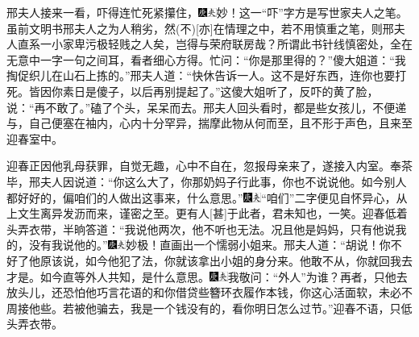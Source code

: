 邢夫人接来一看，吓得连忙死紧攥住，{\includegraphics[width=3mm]{../Images/00004}\includegraphics[width=3mm]{../Images/00012}\footnotesize \kaishu 妙！这一“吓”字方是写世家夫人之笔。虽前文明书邢夫人之为人稍劣，然{(不)}{[}亦{]}在情理之中，若不用慎重之笔，则邢夫人直系一小家卑污极轻贱之人矣，岂得与荣府联房哉？所谓此书针线慎密处，全在无意中一字一句之间耳，看者细心方得。}忙问：“你是那里得的？”傻大姐道：“我掏促织儿在山石上拣的。”邢夫人道：“快休告诉一人。这不是好东西，连你也要打死。皆因你素日是傻子，以后再别提起了。”这傻大姐听了，反吓的黄了脸，说：“再不敢了。”磕了个头，呆呆而去。邢夫人回头看时，都是些女孩儿，不便递与，自己便塞在袖内，心内十分罕异，揣摩此物从何而至，且不形于声色，且来至迎春室中。

迎春正因他乳母获罪，自觉无趣，心中不自在，忽报母亲来了，遂接入内室。奉茶毕，邢夫人因说道：“你这么大了，你那奶妈子行此事，你也不说说他。如今别人都好好的，偏咱们的人做出这事来，什么意思。”{\includegraphics[width=3mm]{../Images/00004}\includegraphics[width=3mm]{../Images/00012}\footnotesize \kaishu “咱们”二字便见自怀异心，从上文生离异发沥而来，谨密之至。更有人{[}甚{]}于此者，君未知也，一笑。}迎春低着头弄衣带，半晌答道：“我说他两次，他不听也无法。况且他是妈妈，只有他说我的，没有我说他的。”{\includegraphics[width=3mm]{../Images/00004}\includegraphics[width=3mm]{../Images/00012}\footnotesize \kaishu 妙极！直画出一个懦弱小姐来。}邢夫人道：“胡说！你不好了他原该说，如今他犯了法，你就该拿出小姐的身分来。他敢不从，你就回我去才是。如今直等外人共知，是什么意思。{\includegraphics[width=3mm]{../Images/00004}\includegraphics[width=3mm]{../Images/00012}\footnotesize \kaishu 我敬问：“外人”为谁？}再者，只他去放头儿，还恐怕他巧言花语的和你借贷些簪环衣履作本钱，你这心活面软，未必不周接他些。若被他骗去，我是一个钱没有的，看你明日怎么过节。”迎春不语，只低头弄衣带。

